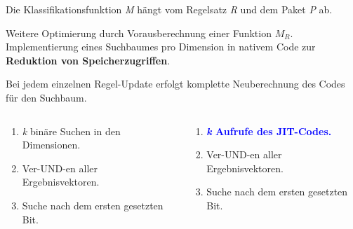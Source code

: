 \documentclass[xcolor=x11names,compress]{beamer}
\renewcommand{\(}{\begin{columns}}
\renewcommand{\)}{\end{columns}}
\newcommand{\<}[1]{\begin{column}{#1}}
\renewcommand{\>}{\end{column}}
\begin{document}
\begin{frame}
  \begin{tcolorbox}[colback=yellow!5!white,colframe=yellow!75!black,title=Erinnerung,drop fuzzy shadow]
  Die Klassifikationsfunktion \textit{M} hängt vom Regelsatz \textit{R} und dem Paket \textit{P} ab.
  \end{tcolorbox}
  \pause
  \begin{tcolorbox}[colback=blue!5!white,colframe=blue!75!black,title=Idee,drop fuzzy shadow]
  Weitere Optimierung durch Vorausberechnung einer Funktion $M_R$.\\
  Implementierung eines Suchbaumes pro Dimension in nativem Code zur \textbf{Reduktion von Speicherzugriffen}.
  \end{tcolorbox}
  \pause
  \begin{tcolorbox}[colback=red!5!white,colframe=red!75!black,title=Nachteil,drop fuzzy shadow]
  Bei jedem einzelnen Regel-Update erfolgt komplette Neuberechnung des Codes für den Suchbaum.
  \end{tcolorbox}
\end{frame}

\begin{frame}
  \begin{columns}[T] %
    \begin{column}{.48\textwidth}
    \begin{tcolorbox}[colback=red!5!white,colframe=red!75!black,title=Standard Bitvector,drop fuzzy shadow]
    \begin{enumerate}[label=\arabic*)]%
      \item \textit{k} binäre Suchen in den Dimensionen.
      \item Ver-UND-en aller Ergebnisvektoren.
      \item Suche nach dem ersten gesetzten Bit.
    \end{enumerate}
    \end{tcolorbox}
    \end{column}
    \hfill
    \pause
    \begin{column}{.48\textwidth}
    \begin{tcolorbox}[colback=blue!5!white,colframe=blue!75!black,title=Bitvector mit JIT,drop fuzzy shadow]
    \begin{enumerate}[label=\arabic*)]%
      \item \textcolor{blue}{\textbf{\textit{k} Aufrufe des JIT-Codes.}}
      \pause
      \item Ver-UND-en aller Ergebnisvektoren.
      \item Suche nach dem ersten gesetzten Bit.
    \end{enumerate}
    \end{tcolorbox}
    \end{column}
  \end{columns}
\end{frame}
\end{document}
